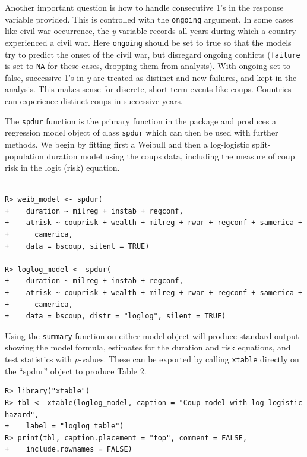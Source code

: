 \documentclass[12pt,onesided]{amsart}
\begin{document}
Another important question is how to handle consecutive 1's
in the response variable provided. This is controlled with the
\texttt{ongoing} argument. In some cases like civil war occurrence, the
\emph{y} variable records all years during which a country experienced a
civil war. Here \texttt{ongoing} should be set to true so that the models
try to predict the onset of the civil war, but disregard ongoing
conflicts (\texttt{failure} is set to \texttt{NA} for these cases, dropping
them from analysis). With ongoing set to false, successive 1's in
\emph{y} are treated as distinct and new failures, and kept in the
analysis. This makes sense for discrete, short-term events like coups.
Countries can experience distinct coups in successive years.

The \texttt{spdur} function is the primary function in the package and
produces a regression model object of class \texttt{spdur} which can then
be used with further methods. We begin by fitting first a Weibull and
then a log-logistic split-population duration model using the coups
data, including the measure of coup risk in the logit (risk) equation.

\begin{lstlisting}

R> weib_model <- spdur(
+    duration ~ milreg + instab + regconf,
+    atrisk ~ couprisk + wealth + milreg + rwar + regconf + samerica + 
+      camerica,
+    data = bscoup, silent = TRUE)

R> loglog_model <- spdur(
+    duration ~ milreg + instab + regconf,
+    atrisk ~ couprisk + wealth + milreg + rwar + regconf + samerica + 
+      camerica,
+    data = bscoup, distr = "loglog", silent = TRUE)

\end{lstlisting}

Using the \texttt{summary} function on either model object will produce
standard output showing the model formula, estimates for the duration
and risk equations, and test statistics with \(p\)-values. These can be
exported by calling \texttt{xtable}\citep[see][]{dahl2016xtable} directly on the ``spdur'' object to
produce Table 2.
\clearpage

\begin{lstlisting}
R> library("xtable")
R> tbl <- xtable(loglog_model, caption = "Coup model with log-logistic hazard",
+    label = "loglog_table")
R> print(tbl, caption.placement = "top", comment = FALSE, 
+    include.rownames = FALSE)
\end{lstlisting}
\end{document}

